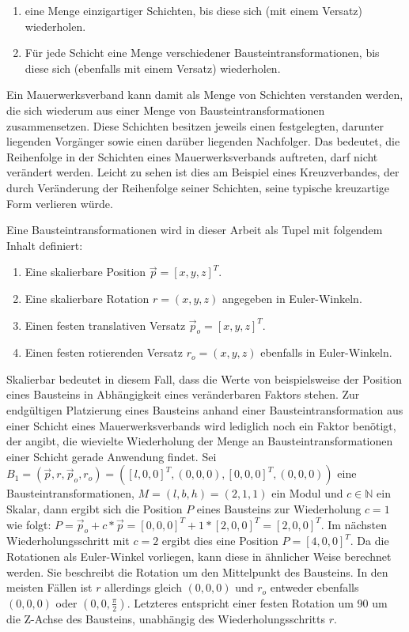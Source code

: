 \begin{enumerate}
    \item eine Menge einzigartiger Schichten, bis diese sich (mit einem Versatz) wiederholen.
    \item Für jede Schicht eine Menge verschiedener Bausteintransformationen, bis diese sich (ebenfalls mit einem Versatz) wiederholen.
\end{enumerate}

Ein Mauerwerksverband kann damit als Menge von Schichten verstanden werden, die sich wiederum aus einer Menge von Bausteintransformationen zusammensetzen.
Diese Schichten besitzen jeweils einen festgelegten, darunter liegenden Vorgänger sowie einen darüber liegenden Nachfolger.
Das bedeutet, die Reihenfolge in der Schichten eines Mauerwerksverbands auftreten, darf nicht verändert werden.
Leicht zu sehen ist dies am Beispiel eines Kreuzverbandes, der durch Veränderung der Reihenfolge seiner Schichten, seine typische kreuzartige Form verlieren würde.

Eine Bausteintransformationen wird in dieser Arbeit als Tupel mit folgendem Inhalt definiert:

\begin{enumerate}
    \item Eine skalierbare Position \(\vec{p} = {[x, y, z]}^T\).
    \item Eine skalierbare Rotation \(r = (x, y, z)\) angegeben in Euler-Winkeln.
    \item Einen festen translativen Versatz \(\vec{p}_o = {[x, y, z]}^T\).
    \item Einen festen rotierenden Versatz \(r_o = (x, y, z)\) ebenfalls in Euler-Winkeln.
\end{enumerate}

Skalierbar bedeutet in diesem Fall, dass die Werte von beispielsweise der Position eines Bausteins in Abhängigkeit eines veränderbaren Faktors stehen.
Zur endgültigen Platzierung eines Bausteins anhand einer Bausteintransformation aus einer Schicht eines Mauerwerksverbands wird lediglich noch ein Faktor benötigt, der angibt, die wievielte Wiederholung der Menge an Bausteintransformationen einer Schicht gerade Anwendung findet.
Sei \(B_1 = (\vec{p}, r, \vec{p}_o, r_o) = ({[l, 0, 0]}^T, (0, 0, 0), {[0, 0, 0]}^T, (0, 0, 0))\) eine Bausteintransformationen, \(M = (l, b, h) = (2, 1, 1)\) ein Modul und \(c\in\mathbb{N}\) ein Skalar,
dann ergibt sich die Position \(P\) eines Bausteins zur Wiederholung \(c = 1\) wie folgt: \(P = \vec{p}_o + c * \vec{p} = {[0, 0, 0]}^T + 1 * {[2, 0, 0]}^T = {[2, 0, 0]}^T\).
Im nächsten Wiederholungsschritt mit \(c = 2\) ergibt dies eine Position \(P = {[4, 0, 0]}^T\).
Da die Rotationen als Euler-Winkel vorliegen, kann diese in ähnlicher Weise berechnet werden.
Sie beschreibt die Rotation um den Mittelpunkt des Bausteins.
In den meisten Fällen ist \(r\) allerdings gleich \((0, 0, 0)\) und \(r_o\) entweder ebenfalls \((0, 0, 0)\) oder \((0, 0, \frac{\pi}{2})\).
Letzteres entspricht einer festen Rotation um 90\degree{} um die Z-Achse des Bausteins, unabhängig des Wiederholungsschritts \(r\).

